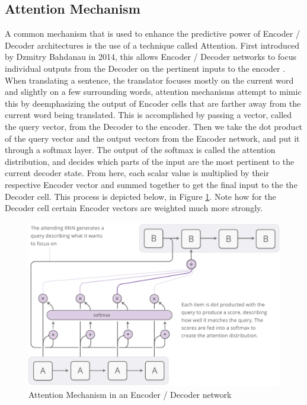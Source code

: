 \documentclass[pageno]{jpaper}
\begin{document}
\subsection{Attention Mechanism}
A common mechanism that is used to enhance the predictive power of Encoder / Decoder architectures is the use of a technique called Attention.  First introduced by Dzmitry Bahdanau in 2014, this allows Encoder / Decoder networks to focus individual outputs from the Decoder on the pertinent inputs to the encoder \cite{bahdanau:2014}.  When translating a sentence, the translator focuses mostly on the current word and slightly on a few surrounding words, attention mechanisms attempt to mimic this by deemphasizing the output of Encoder cells that are farther away from the current word being translated.  This is accomplished by passing a vector, called the query vector, from the Decoder to the encoder.  Then we take the dot product of the query vector and the output vectors from the Encoder network, and put it through a softmax layer.  The output of the softmax is called the attention distribution, and decides which parts of the input are the most pertinent to the current decoder state.  From here, each scalar value is multiplied by their respective Encoder vector and summed together to get the final input to the the Decoder cell.  This process is depicted below, in Figure \ref{fg:attn}.  Note how for the Decoder cell certain Encoder vectors are weighted much more strongly.
\begin{figure}[H]
	\centering
	\includegraphics[scale=0.73]{attentionRNN.pdf}
	\caption{Attention Mechanism in an Encoder / Decoder network \cite{olah:2016}}
	\label{fg:attn}
\end{figure}
\end{document}
